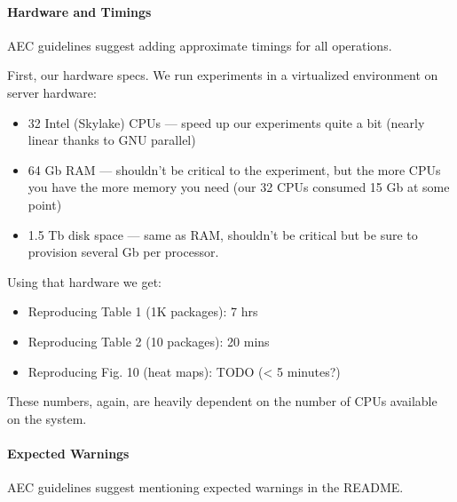 \documentclass[
]{article}
\providecommand{\tightlist}{%
  \setlength{\itemsep}{0pt}\setlength{\parskip}{0pt}}
\begin{document}
\hypertarget{hardware-and-timings}{%
\paragraph{Hardware and Timings}\label{hardware-and-timings}}

AEC guidelines suggest adding approximate timings for all operations.

First, our hardware specs. We run experiments in a virtualized
environment on server hardware:

\begin{itemize}
\item
  32 Intel (Skylake) CPUs --- speed up our experiments quite a bit
  (nearly linear thanks to GNU parallel)
\item
  64 Gb RAM --- shouldn't be critical to the experiment, but the more
  CPUs you have the more memory you need (our 32 CPUs consumed 15 Gb at
  some point)
\item
  1.5 Tb disk space --- same as RAM, shouldn't be critical but be sure to
  provision several Gb per processor.
\end{itemize}

Using that hardware we get:

\begin{itemize}
\tightlist
\item
  Reproducing Table 1 (1K packages): 7 hrs
\item
  Reproducing Table 2 (10 packages): 20 mins
\item
  Reproducing Fig. 10 (heat maps): TODO (\textless{} 5 minutes?)
\end{itemize}

These numbers, again, are heavily dependent on the number of CPUs
available on the system.

\hypertarget{expected-warnings}{%
\paragraph{Expected Warnings}\label{expected-warnings}}

AEC guidelines suggest mentioning expected warnings in the README.
\end{document}
